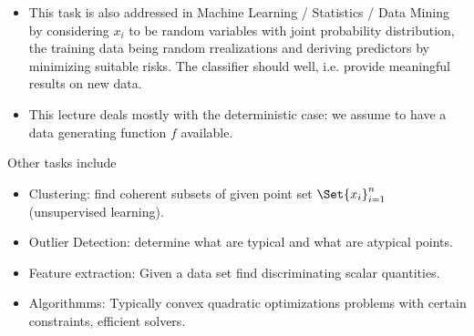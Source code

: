 \begin{description}
\begin{itemize}
            \item
                This task is also addressed in Machine Learning / Statistics / Data Mining by considering $x_i$ to be random variables with joint probability distribution, the training data being random rrealizations and deriving predictors by minimizing suitable risks.
                The classifier should  well, i.e. provide meaningful results on new data.
            \item
                This lecture deals mostly with the deterministic case: we assume to have a data generating function $f$ available.
        \end{itemize}
        Other tasks include
        \begin{itemize}
            \item
                Clustering: find coherent subsets of given point set $\Set{x_i}_{i=1}^n$ (unsupervised learning).
            \item
                Outlier Detection: determine what are typical and what are atypical points.
            \item
                Feature extraction: Given a data set find discriminating scalar quantities.
            \item
                Algorithmms: Typically convex quadratic optimizations problems with certain constraints, efficient solvers.
        \end{itemize}
\end{description}




